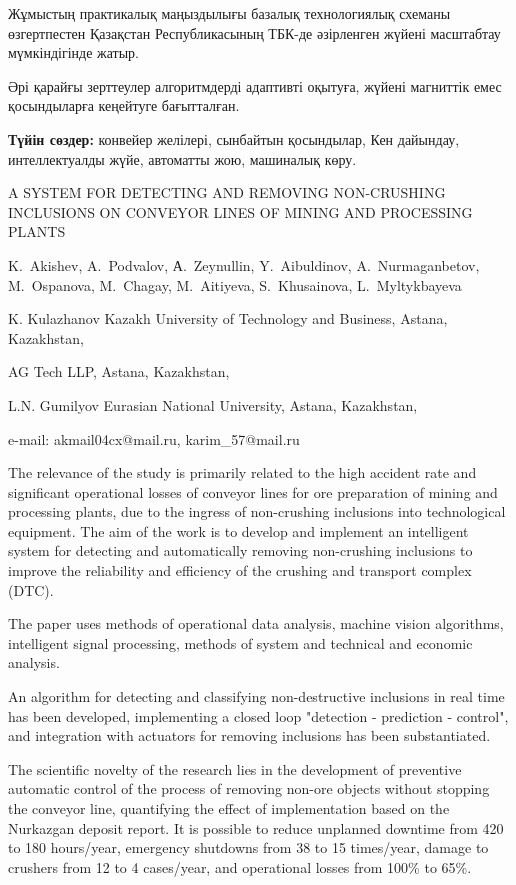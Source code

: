 Жұмыстың практикалық маңыздылығы базалық технологиялық схеманы
өзгертпестен Қазақстан Республикасының ТБК-де әзірленген жүйені
масштабтау мүмкіндігінде жатыр.

Әрі қарайғы зерттеулер алгоритмдерді адаптивті оқытуға, жүйені магниттік
емес қосындыларға кеңейтуге бағытталған.

{\bfseries Түйін сөздер:} конвейер желілері, сынбайтын қосындылар, Кен
дайындау, интеллектуалды жүйе, автоматты жою, машиналық көру.

\begin{header}
A SYSTEM FOR DETECTING AND REMOVING NON-CRUSHING INCLUSIONS ON CONVEYOR LINES OF MINING AND PROCESSING PLANTS

K.~Akishev\envelope,
A.~Podvalov,
А.~Zeynullin\envelope,
Y.~Aibuldinov\envelope,
A.~Nurmaganbetov,
M.~Ospanova,
M.~Chagay,
M.~Aitiyeva,
S.~Khusainova,
L.~Myltykbayeva
\end{header}

\begin{affil}
K. Kulazhanov Kazakh University of Technology and Business, Astana, Kazakhstan,

AG Tech LLP, Astana, Kazakhstan,

L.N. Gumilyov Eurasian National University, Astana, Kazakhstan,

e-mail: akmail04cx@mail.ru, karim\_57@mail.ru
\end{affil}

The relevance of the study is primarily related to the high accident
rate and significant operational losses of conveyor lines for ore
preparation of mining and processing plants, due to the ingress of
non-crushing inclusions into technological equipment. The aim of the
work is to develop and implement an intelligent system for detecting and
automatically removing non-crushing inclusions to improve the
reliability and efficiency of the crushing and transport complex (DTC).

The paper uses methods of operational data analysis, machine vision
algorithms, intelligent signal processing, methods of system and
technical and economic analysis.

An algorithm for detecting and classifying non-destructive inclusions in
real time has been developed, implementing a closed loop "detection -
prediction - control", and integration with actuators for removing
inclusions has been substantiated.

The scientific novelty of the research lies in the development of
preventive automatic control of the process of removing non-ore objects
without stopping the conveyor line, quantifying the effect of
imple\-mentation based on the Nurkazgan deposit report. It is possible to
reduce unplanned downtime from 420 to 180 hours/year, emergency
shutdowns from 38 to 15 times/year, damage to crushers from 12 to 4
cases/year, and operational losses from 100\% to 65\%.

